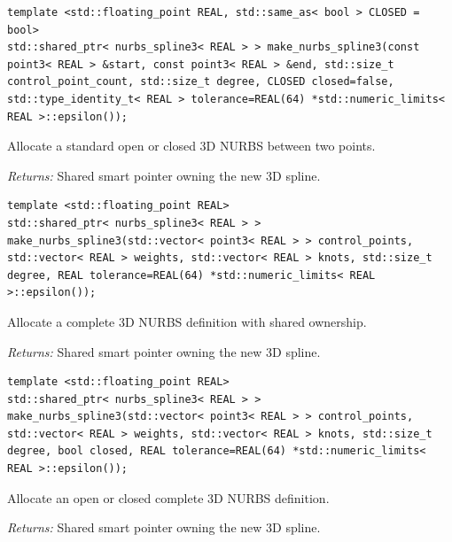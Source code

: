 \par\noindent\begin{minipage}{\linewidth}
\begin{lstlisting}[style=apireference]
template <std::floating_point REAL, std::same_as< bool > CLOSED = bool>
std::shared_ptr< nurbs_spline3< REAL > > make_nurbs_spline3(const point3< REAL > &start, const point3< REAL > &end, std::size_t control_point_count, std::size_t degree, CLOSED closed=false, std::type_identity_t< REAL > tolerance=REAL(64) *std::numeric_limits< REAL >::epsilon());
\end{lstlisting}
{\footnotesize Allocate a standard open or closed 3D NURBS between two points.\par}
{\footnotesize\textit{Returns:} Shared smart pointer owning the new 3D spline.\par}
\end{minipage}\par\vspace{1pt}
\par\noindent\begin{minipage}{\linewidth}
\begin{lstlisting}[style=apireference]
template <std::floating_point REAL>
std::shared_ptr< nurbs_spline3< REAL > > make_nurbs_spline3(std::vector< point3< REAL > > control_points, std::vector< REAL > weights, std::vector< REAL > knots, std::size_t degree, REAL tolerance=REAL(64) *std::numeric_limits< REAL >::epsilon());
\end{lstlisting}
{\footnotesize Allocate a complete 3D NURBS definition with shared ownership.\par}
{\footnotesize\textit{Returns:} Shared smart pointer owning the new 3D spline.\par}
\end{minipage}\par\vspace{1pt}
\par\noindent\begin{minipage}{\linewidth}
\begin{lstlisting}[style=apireference]
template <std::floating_point REAL>
std::shared_ptr< nurbs_spline3< REAL > > make_nurbs_spline3(std::vector< point3< REAL > > control_points, std::vector< REAL > weights, std::vector< REAL > knots, std::size_t degree, bool closed, REAL tolerance=REAL(64) *std::numeric_limits< REAL >::epsilon());
\end{lstlisting}
{\footnotesize Allocate an open or closed complete 3D NURBS definition.\par}
{\footnotesize\textit{Returns:} Shared smart pointer owning the new 3D spline.\par}
\end{minipage}\par\vspace{1pt}
